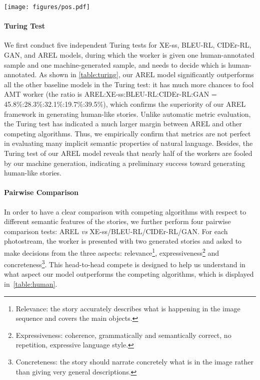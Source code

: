 \documentclass[11pt,a4paper]{article}
\begin{document}
\begin{figure*}
\centering
  \texttt{[image: figures/pos.pdf]}  
  \vspace{-1ex}
  \caption{Qualitative comparison example with XE-ss. The direct comparison votes (AREL:XE-ss:Tie) were 5:0:0 on Relevance, 4:0:1 on Expressiveness, and 5:0:0 on Concreteness. }
  \label{fig:pos}
\end{figure*}

\paragraph{Turing Test} We first conduct five independent Turing tests for XE-ss, BLEU-RL, CIDEr-RL, GAN, and AREL models, during which the worker is given one human-annotated sample and one machine-generated sample, and needs to decide which is human-annotated. As shown in \autoref{table:turing}, our AREL model significantly outperforms all the other baseline models in the Turing test: it has much more chances to fool AMT worker (the ratio is AREL:XE-ss:BLEU-RL:CIDEr-RL:GAN = 45.8\%:28.3\%:32.1\%:19.7\%:39.5\%), which confirms the superiority of our AREL framework in generating human-like stories. Unlike automatic metric evaluation, the Turing test has indicated a much larger margin between AREL and other competing algorithms. Thus, we empirically confirm that metrics are not perfect in evaluating many implicit semantic properties of natural language.
Besides, the Turing test of our AREL model reveals that nearly half of the workers are fooled by our machine generation, indicating a preliminary success toward generating human-like stories. 

\paragraph{Pairwise Comparison} In order to have a clear comparison with competing algorithms with respect to different semantic features of the stories, we further perform four pairwise comparison tests: AREL \textit{vs} XE-ss/BLEU-RL/CIDEr-RL/GAN. For each photostream, the worker is presented with two generated stories and asked to make decisions from the  three aspects: relevance\footnote{Relevance: the story accurately describes what is happening in the image sequence and covers the main objects.}, expressiveness\footnote{Expressiveness: coherence, grammatically and semantically correct, no repetition, expressive language style.} and concreteness\footnote{Concreteness: the story should narrate concretely what is in the image rather than giving very general descriptions.}. This head-to-head compete is designed to help us understand in what aspect our model outperforms the competing algorithms, which is displayed in~\autoref{table:human}.
\end{document}
